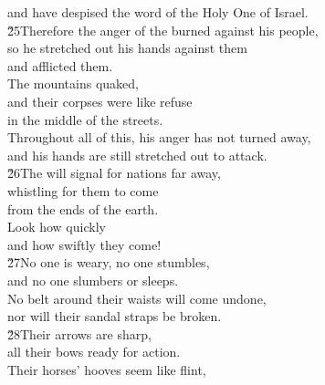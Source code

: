 \begin{poetry}
\poemll    and have despised the word of the Holy One of Israel. \\
\poeml \v{25}Therefore the anger of the  burned against his people, \\
\poemll    so he stretched out his hands against them \\
\poemlll       and afflicted them. \\
\poeml The mountains quaked, \\
\poemll    and their corpses were like refuse \\
\poemlll       in the middle of the streets. \\
\poeml Throughout all of this, his anger has not turned away, \\
\poemll    and his hands are still stretched out to attack. \\
\poeml \v{26}The  will signal for nations far away, \\
\poemll    whistling for them to come \\
\poemlll       from the ends of the earth. \\
\poeml Look how quickly \\
\poemll    and how swiftly they come! \\
\poeml \v{27}No one is weary, no one stumbles, \\
\poemll    and no one slumbers or sleeps. \\
\poeml No belt around their waists will come undone, \\
\poemll    nor will their sandal straps be broken. \\
\poeml \v{28}Their arrows are sharp, \\
\poemll    all their bows ready for action. \\
\poeml Their horses' hooves seem like flint, \\

\end{poetry}
